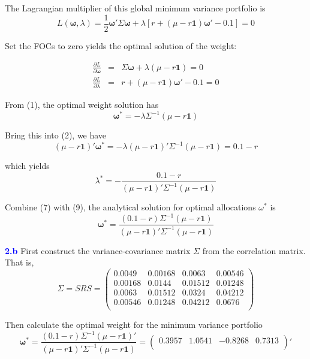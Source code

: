 \documentclass[a4paper,11pt] {article}
\begin{document}
The Lagrangian multiplier of this global minimum variance portfolio is
$$
L(\mathbf{\omega}, \lambda) = \frac{1}{2}\mathbf{\omega}'\Sigma\mathbf{\omega} + \lambda[r + (\mu-r\mathbf{1})\mathbf{\omega}' - 0.1] = 0
$$

Set the FOCs to zero yields the optimal solution of the weight:

\begin{eqnarray}
\frac{\partial L}{\partial \mathbf{\omega}} &=& \Sigma \mathbf{\omega} + \lambda (\mu-r\mathbf{1}) = 0 \\
\frac{\partial L}{\partial \lambda} &=& r + (\mu-r\mathbf{1})\mathbf{\omega}' - 0.1 = 0
\end{eqnarray}

From (1), the optimal weight solution has
\begin{equation}
\mathbf{\omega}^* = -\lambda \Sigma^{-1} (\mu-r\mathbf{1})
\end{equation}

Bring this into (2), we have
\begin{equation}
(\mu-r\mathbf{1})'\mathbf{\omega}^{*} = -\lambda (\mu-r\mathbf{1})'\Sigma^{-1}(\mu-r\mathbf{1}) = 0.1-r
\end{equation}

which yields
\begin{equation}
\lambda^* = -\frac{0.1-r}{(\mu-r\mathbf{1})'\Sigma^{-1}(\mu-r\mathbf{1})}
\end{equation}

Combine (7) with (9), the analytical solution for optimal allocations $\omega^*$ is
$$
\mathbf{\omega}^* = \frac{(0.1-r)\Sigma^{-1}(\mu-r\mathbf{1})}{(\mu-r\mathbf{1})'\Sigma^{-1}(\mu-r\mathbf{1})}
$$

\textcolor{blue}{\bf 2.b } First construct the variance-covariance matrix $\Sigma$ from the correlation matrix. That is,
$$
\Sigma = SRS =
\left(
  \begin{array}{cccc}
0.0049	&	0.00168	&	0.0063	&	0.00546	\\
0.00168	&	0.0144	&	0.01512	&	0.01248	\\
0.0063	&	0.01512	&	0.0324	&	0.04212	\\
0.00546	&	0.01248	&	0.04212	&	0.0676	\\
  \end{array}
\right)
$$

Then calculate the optimal weight for the minimum variance portfolio
$$
\mathbf{\omega}^* = \frac{(0.1-r)\Sigma^{-1}(\mu-r\mathbf{1})'}{(\mu-r\mathbf{1})'\Sigma^{-1}(\mu-r\mathbf{1})} =
\left(
  \begin{array}{cccc}
    0.3957 & 1.0541 & -0.8268 & 0.7313 \\
  \end{array}
\right)'
$$
\end{document}

